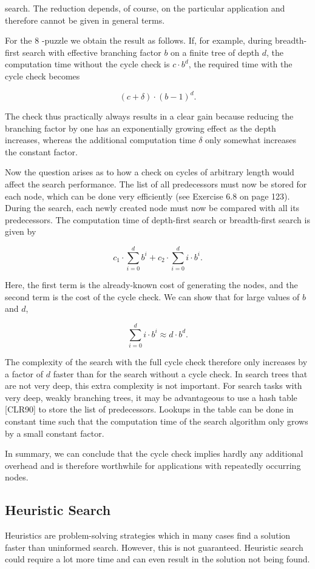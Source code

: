 \documentclass[10pt]{article}
\begin{document}
search. The reduction depends, of course, on the particular application and therefore cannot be given in general terms.

For the 8 -puzzle we obtain the result as follows. If, for example, during breadth-first search with effective branching factor $b$ on a finite tree of depth $d$, the computation time without the cycle check is $c \cdot b^{d}$, the required time with the cycle check becomes

$$
(c+\delta) \cdot(b-1)^{d} .
$$

The check thus practically always results in a clear gain because reducing the branching factor by one has an exponentially growing effect as the depth increases, whereas the additional computation time $\delta$ only somewhat increases the constant factor.

Now the question arises as to how a check on cycles of arbitrary length would affect the search performance. The list of all predecessors must now be stored for each node, which can be done very efficiently (see Exercise 6.8 on page 123). During the search, each newly created node must now be compared with all its predecessors. The computation time of depth-first search or breadth-first search is given by

$$
c_{1} \cdot \sum_{i=0}^{d} b^{i}+c_{2} \cdot \sum_{i=0}^{d} i \cdot b^{i} .
$$

Here, the first term is the already-known cost of generating the nodes, and the second term is the cost of the cycle check. We can show that for large values of $b$ and $d$,

$$
\sum_{i=0}^{d} i \cdot b^{i} \approx d \cdot b^{d} .
$$

The complexity of the search with the full cycle check therefore only increases by a factor of $d$ faster than for the search without a cycle check. In search trees that are not very deep, this extra complexity is not important. For search tasks with very deep, weakly branching trees, it may be advantageous to use a hash table [CLR90] to store the list of predecessors. Lookups in the table can be done in constant time such that the computation time of the search algorithm only grows by a small constant factor.

In summary, we can conclude that the cycle check implies hardly any additional overhead and is therefore worthwhile for applications with repeatedly occurring nodes.

\subsection*{Heuristic Search}
Heuristics are problem-solving strategies which in many cases find a solution faster than uninformed search. However, this is not guaranteed. Heuristic search could require a lot more time and can even result in the solution not being found.
\end{document}
